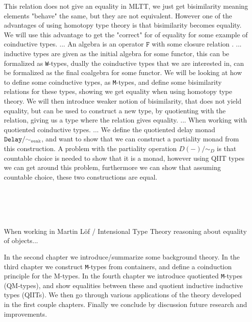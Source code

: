 \documentclass[twoside,11pt,openright]{report}
\theoremstyle{plain} %
\theoremstyle{definition}
\theoremstyle{remark}
\newcommand*{\relation}[1]{\textcolor{gray!75!black}{\ensuremath{\mathtt{#1}}}}
\newcommand*{\typeformer}[1]{\ensuremath{\mathtt{#1}}}
\newcommand*{\functor}[1]{\ensuremath{\mathbf{\mathtt{#1}}}}
\begin{document}
This relation does not give an equality in MLTT, we just get bisimilarity meaning elements "behave" the same, but they are not equivalent. However one of the advantages of using homotopy type theory is that bisimilarity becomes equality. We will use this advantage to get the "correct" for of equality for some example of coinductive types. ... An algebra is an operator \(\functor{F}\) with some closure relation . ... inductive types are given as the initial algebra for some functor, this can be formalized as \texttt{W}-types, dually the coinductive types that we are interested in, can be formalized as the final coalgebra  for some functor. We will be looking at how to define some coinductive types, as \texttt{M}-types, and define some bisimilarity relations for these types, showing we get equality when using homotopy type theory. We will then introduce weaker notion of bisimilarity, that does not yield equality, but can be used to construct a new type, by quotienting with the relation, giving us a type where the relation gives equality. ... When working with quotiented coinductive types.  ... We define the quotiented delay monad \(\typeformer{Delay}/\relation{\sim_{weak}}\), and want to show that we can construct a partiality monad from this construction. A problem with the partiality operation \(D(-)/{\sim}_D\) is that countable choice is needed to show that it is a monad, however using QIIT types we can get around this problem, furthermore we can show that assuming countable choice, these two constructions are equal.

~\\ \\ \\ \\
When working in Martin L\"of / Intensional Type Theory reasoning about equality of objects...

In the second chapter we introduce/summarize some background theory. In the third chapter we construct \texttt{M}-types from containers, and define a coinduction principle for the M-types. In the fourth chapter we introduce quotiented \texttt{M}-types (QM-types), and show equalities between these and quotient inductive inductive types (QIITs). We then go through various applications of the theory developed in the first couple chapters. Finally we conclude by discussion future research and improvements.
\end{document}
